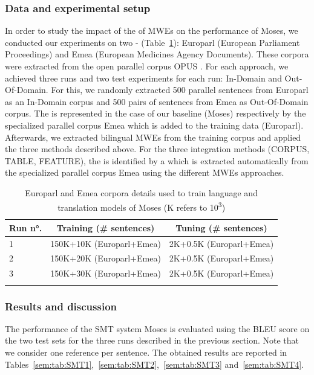 \documentclass[output=paper,modfonts,nonflat]{langsci/langscibook}
\begin{document}
\subsubsection{Data and experimental setup}\label{sec:semmar:5.2.1}
In order to study the impact of the  of MWEs on the performance of Moses, we conducted our experiments on two -  (Table~\ref{sem:tab:data}): Europarl (European Parliament Proceedings) and Emea (European Medicines Agency Documents). These corpora were extracted from the open parallel corpus OPUS \citep{tiedemann2012parallel}. For each  approach, we achieved three runs and two test experiments for each run: In-Domain and Out-Of-Domain. For this, we randomly extracted 500 parallel sentences from Europarl as an In-Domain corpus and 500 pairs of sentences from Emea as Out-Of-Domain corpus. The  is represented in the case of our baseline (Moses) respectively by the specialized parallel corpus Emea which is added to the training data (Europarl). Afterwards, we extracted bilingual MWEs from the training corpus and applied the three methods described above. For the three integration methods (CORPUS, TABLE, FEATURE), the  is identified by a  which is extracted automatically from the specialized parallel corpus Emea using the different MWEs  approaches.

\begin{table}
\caption{Europarl and Emea corpora details used to train language and translation models of Moses (K refers to 10\textsuperscript{3})}
\label{sem:tab:data}
\centering
 \begin{tabular}{lcc} 
  \lsptoprule
  Run n°. & Training (\# sentences) & Tuning (\# sentences) \\
  \midrule
1 & 150K+10K (Europarl+Emea) & 2K+0.5K (Europarl+Emea)\\
2 & 150K+20K (Europarl+Emea) & 2K+0.5K (Europarl+Emea)\\
3 & 150K+30K (Europarl+Emea) & 2K+0.5K (Europarl+Emea)\\
  \lspbottomrule
 \end{tabular}
\end{table}


\subsubsection{Results and discussion}\label{sec:semmar:5.2.2}
The performance of the SMT system Moses is evaluated using the BLEU score \citep{papineni2002bleu} on the two test sets for the three runs described in the previous section. 
Note that we consider one reference per sentence. The obtained results are reported in Tables~\ref{sem:tab:SMT1},~\ref{sem:tab:SMT2},~\ref{sem:tab:SMT3} and~\ref{sem:tab:SMT4}.
\end{document}
